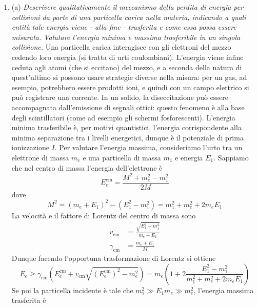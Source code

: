 \documentclass{article}
\renewcommand{\a}{(a)}
\renewcommand{\t}[1]{\textit{ #1}}
\begin{document}
\begin{enumerate}
{		[formula di Tsai, non dimostrata a lezione] che fornisce la lunghezza di
		radiazione.} $\rho$ è la densità del materiale, $\alpha$ la costante di struttura fine, $r_e$ il raggio classico dell'elettrone, $Z$ il numero atomico, $A(g)$ la massa atomica in g, $N_A$ il numero di Avogadro, $f$ una funzione di $Z$ nella forma di una serie. Posto $a=\alpha Z$, i primi termini della serie sono
	\[f(Z)=a^2[(1+a^2)^{-1}+0.202066-0.0369a^2+0.0083a^4-0.002a^6+\dots]\]
	Infine, $L'$ dipende dal materiale e per elementi con $Z\geq5$ è
	\[L'=\ln\frac{194}{Z^{2/3}}\]
	\item\a\t{Descrivere qualitativamente il meccanismo della perdita di energia per collisioni
		da parte di una particella carica nella materia, indicando a quali entità tale energia
		viene - alla fine - trasferita e come essa possa essere misurata. Valutare l’energia
		minima e massima trasferibile in un singola collisione.} Una particella carica interagisce con gli elettroni del mezzo cedendo loro energia (si tratta di urti coulombiani). L'energia viene infine ceduta agli atomi (che si eccitano) del mezzo, e a seconda della natura di quest'ultimo si possono usare strategie diverse nella misura: per un gas, ad esempio, potrebbero essere prodotti ioni, e quindi con un campo elettrico si può registrare una corrente. In un solido, la diseccitazione può essere accompagnata dall'emissione di segnali ottici: questo fenomeno è alla base degli scintillatori (come ad esempio gli schermi fosforescenti).	
		\noindent L'energia minima trasferibile è, per motivi quantistici, l'energia corrispondente alla minima separazione tra i livelli energetici, dunque è il potenziale di prima ionizzazione $I$. Per valutare l'energia massima, consideriamo l'urto tra un elettrone di massa $m_e$ e una particella di massa $m_1$ e energia $E_1$. Sappiamo che nel centro di massa l'energia dell'elettrone è
		\[E_e^{\textrm{cm}}=\frac{M^2+m_e^2-m_1^2}{2M}\]
		dove
		\[M^2=(m_e+E_1)^2-(E_1^2-m_1^2)=m_1^2+m_e^2+2m_eE_1\]
		La velocità e il fattore di Lorentz del centro di massa sono
		\begin{align*}
			v_\textrm{cm}&=\frac{\sqrt{E_1^2-m_1^2}}{m_e+E_1}\\\gamma_\textrm{cm}&=\frac{m_e+E_1}{M}
		\end{align*}
	Dunque facendo l'opportuna trasformazione di Lorentz si ottiene
	\[E_e\geq \gamma_\textrm{cm}\left(E_e^\textrm{cm}+v_\textrm{cm}\sqrt{(E_e^\textrm{cm})^2-m_e^2}\right)=m_e\left(1+2\frac{E_1^2-m_1^2}{m_1^2+m_e^2+2m_eE_1}\right)\]
	Se poi la particella incidente è tale che $m_1^2\gg E_1m_e\gg m_e^2$, l'energia massima trasferita è

\end{enumerate}
\end{document}
